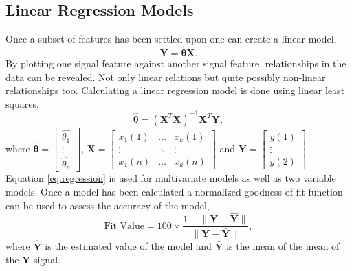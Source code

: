 \documentclass[]{article}
\begin{document}
\subsection{Linear Regression Models}
Once a subset of features has been settled upon one can create a linear model,
\begin{equation} \label{eq:linearModel}
	\mathbf{Y} = \hat{\boldsymbol{\theta}} \mathbf{X}.
\end{equation}
By plotting one signal feature against another signal feature, relationships in the data can be revealed. Not only linear relations but quite possibly non-linear relationships too. Calculating a linear regression model is done using linear least squares, 
\begin{equation} \label{eq:regression}
	\hat{\boldsymbol{\theta}} = (\mathbf{X}^T \mathbf{X})^{-1} \mathbf{X}^T \mathbf{Y},
\end{equation}
where $ \hat{\boldsymbol{\theta}} = \begin{bmatrix} \hat{\theta_{1}} \\ \vdots \\ \hat{\theta_{n}} \end{bmatrix} $, $ \mathbf{X} = \begin{bmatrix} x_{1}(1) & \hdots & x_{k}(1) \\ \vdots & \ddots & \vdots \\ x_{1}(n) & \hdots & x_{k}(n)  \end{bmatrix}$ and 
$ \mathbf{Y} = \begin{bmatrix} y(1) \\ \vdots \\ y(2)\end{bmatrix}$ ~\cite{james2013introduction}.\\
Equation \ref{eq:regression} is used for multivariate models as well as two variable models. Once a model has been calculated a normalized goodness of fit function can be used to assess the accuracy of the model,
\begin{equation}
	\textrm{Fit Value} = 100 \times \frac{ 1 - \lVert\mathbf{Y} - \mathbf{\hat{Y}}\rVert } { \lVert \mathbf{Y} - \mathbf{\bar{Y}} \rVert },
\end{equation}
where $\mathbf{\hat{Y}}$ is the estimated value of the model and $\mathbf{\bar{Y}}$ is the mean of the mean of the $\mathbf{Y}$ signal.
\end{document}
